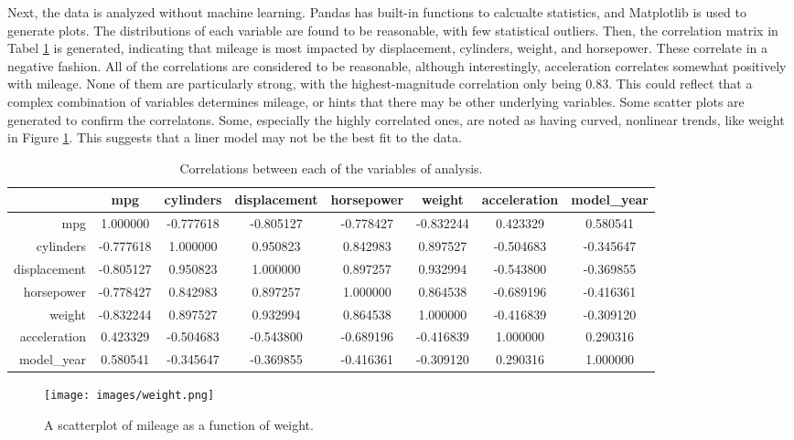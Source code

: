 \documentclass{article}
\begin{document}
Next, the data is analyzed without machine learning. Pandas has built-in functions to calcualte statistics, and Matplotlib is used to generate plots. The distributions of each variable are found to be reasonable, with few statistical outliers. Then, the correlation matrix in Tabel \ref{tbl:corr} is generated, indicating that mileage is most impacted by displacement, cylinders, weight, and horsepower. These correlate in a negative fashion. All of the correlations are considered to be reasonable, although interestingly, acceleration correlates somewhat positively with mileage. None of them are particularly strong, with the highest-magnitude correlation only being 0.83. This could reflect that a complex combination of variables determines mileage, or hints that there may be other underlying variables. Some scatter plots are generated to confirm the correlatons. Some, especially the highly correlated ones, are noted as having curved, nonlinear trends, like weight in Figure \ref{fig:weight}. This suggests that a liner model may not be the best fit to the data.

\begin{table}[h!]
	\caption{Correlations between each of the variables of analysis.}
	\label{tbl:corr}
	\begin{tabular}{rccccccc}
		& mpg	& cylinders & displacement & horsepower & weight & acceleration & model\_year \\
		\hline
		mpg & 1.000000 & -0.777618 & -0.805127 & -0.778427 & -0.832244 & 0.423329 & 0.580541 \\
		cylinders & -0.777618 & 1.000000 & 0.950823 & 0.842983 & 0.897527 & -0.504683 & -0.345647 \\
		displacement & -0.805127 & 0.950823 & 1.000000 & 0.897257 & 0.932994 & -0.543800 & -0.369855 \\
		horsepower & -0.778427 & 0.842983 & 0.897257 & 1.000000 & 0.864538 & -0.689196 & -0.416361 \\
		weight & -0.832244 & 0.897527 & 0.932994 & 0.864538 & 1.000000 & -0.416839 & -0.309120 \\
		acceleration & 0.423329 & -0.504683 & -0.543800 & -0.689196 & -0.416839 & 1.000000 & 0.290316 \\
		model\_year & 0.580541 & -0.345647 & -0.369855 & -0.416361 & -0.309120 & 0.290316 & 1.000000
	\end{tabular}
\end{table}

\begin{figure}[h!]
	\centering
	\texttt{[image: images/weight.png]}
	\caption{A scatterplot of mileage as a function of weight.}
	\label{fig:weight}
\end{figure}
\end{document}
